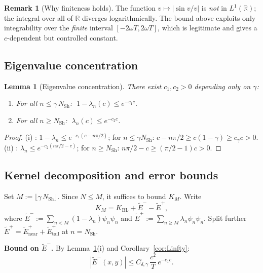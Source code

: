 \documentclass[12pt,a4paper]{article}
\newtheorem{lemma}[theorem]{Lemma}
\theoremstyle{definition}
\newtheorem{remark}[theorem]{Remark}
\newcommand{\NSh}{N_{\mathrm{Sh}}}
\newcommand{\KBL}{K_{\mathrm{BL}}}
\begin{document}
\begin{remark}[Why finiteness holds]
The function $v \mapsto |\sin v/v|$ is \emph{not}
in $L^1(\mathbb{R})$; the integral over all of $\mathbb{R}$
diverges logarithmically.
The bound above exploits only integrability over the
\emph{finite} interval $[-2\omega T, 2\omega T]$,
which is legitimate and gives a $c$-dependent but
controlled constant.
\end{remark}

\subsection{Eigenvalue concentration}

\begin{lemma}[Eigenvalue concentration]
\label{lem:eigenvalue-decay}
There exist $c_1, c_2 > 0$ depending only on $\gamma$:
\begin{enumerate}[label=(\roman*)]
  \item For all $n \le \gamma\,\NSh$:
  $\;1 - \lambda_n(c) \le e^{-c_1 c}$.
  \item For all $n \ge \NSh$:
  $\;\lambda_n(c) \le e^{-c_2 c}$.
\end{enumerate}
\end{lemma}

\begin{proof}
(i) \cite[Theorem~4.6]{OsipovRokhlinXiao}:
$1-\lambda_n \le e^{-c_1(c-n\pi/2)}$;
for $n \le \gamma\NSh$:
$c - n\pi/2 \ge c(1-\gamma) \ge c_\gamma c > 0$.
(ii) \cite[Theorem~4.9]{OsipovRokhlinXiao}:
$\lambda_n \le e^{-c_2(n\pi/2-c)}$;
for $n \ge \NSh$:
$n\pi/2 - c \ge (\pi/2-1)c > 0$.
\end{proof}

\subsection{Kernel decomposition and error bounds}

Set $M := \lfloor\gamma\,\NSh\rfloor$.
Since $N \le M$, it suffices to bound $K_M$. Write
\begin{equation}
\label{eq:split}
  K_M = \KBL + \widetilde{E}^- - \widetilde{E}^+,
\end{equation}
where
$\widetilde{E}^- := \sum_{n<M}(1-\lambda_n)\psi_n\psi_n$
and
$\widetilde{E}^+ := \sum_{n\ge M}\lambda_n\psi_n\psi_n$.
Split further
$\widetilde{E}^+ = \widetilde{E}^+_{\mathrm{near}}
+ \widetilde{E}^+_{\mathrm{tail}}$ at $n = \NSh$.

\medskip\noindent
\textbf{Bound on $\widetilde{E}^-$.}
By Lemma~\ref{lem:eigenvalue-decay}(i) and
Corollary~\ref{cor:Linfty}:
\begin{equation}
\label{eq:Eminus-final}
  |\widetilde{E}^-(x,y)|
  \le C_{\delta,\gamma}\,\frac{c^2}{T}\,e^{-c_1 c}.
\end{equation}
\end{document}
